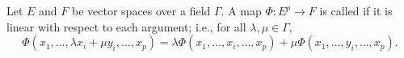 Let $E$ and $F$ be vector spaces over a field $\Gamma$. A map $\Phi: E^p \to F$ is called  if it is linear with respect to each argument; i.e., for all $\lambda, \mu \in \Gamma$,
$$\Phi(x_1, \ldots, \lambda x_i + \mu y_i, \ldots, x_p) = \lambda \Phi(x_1, \ldots, x_i, \ldots, x_p) + \mu \Phi(x_1, \ldots, y_i, \ldots, x_p).$$
